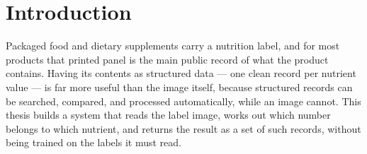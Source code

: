 %
%
%
%
%
%
%

\chapter{Introduction}\label{chap:introduction}

Packaged food and dietary supplements carry a nutrition label, and for most
products that printed panel is the main public record of what the product
contains. Having its contents as structured data --- one clean record per
nutrient value --- is far more useful than the image itself, because structured
records can be searched, compared, and processed automatically, while an image
cannot. This thesis builds a system that reads the label image, works out which
number belongs to which nutrient, and returns the result as a set of such
records, without being trained on the labels it must read.


